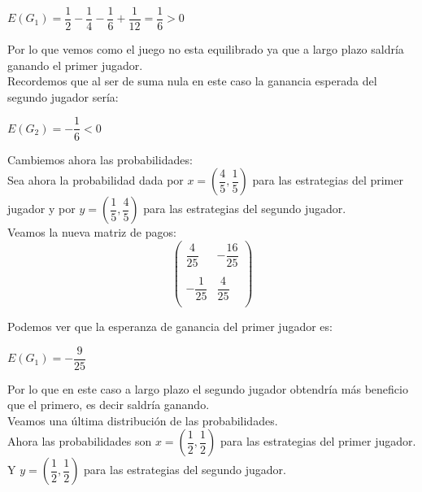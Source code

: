 \documentclass[10pt,a4paper]{book}
\begin{document}
\begin{center}

$ E(G_1)=\dfrac{1}{2}-\dfrac{1}{4}-\dfrac{1}{6}+\dfrac{1}{12}= \dfrac{1}{6} >0$

\end{center}

Por lo que vemos como el juego no esta equilibrado ya que a largo plazo saldría ganando el primer jugador. \\
Recordemos que al ser de suma nula en este caso la ganancia esperada del segundo jugador sería:\\

\begin{center}

$ E(G_2)=-\dfrac{1}{6} <0$

\end{center}

Cambiemos ahora las probabilidades:\\

Sea ahora la probabilidad dada por $x=(\dfrac{4}{5},\dfrac{1}{5})$ para las estrategias del primer jugador y por $y=(\dfrac{1}{5},\dfrac{4}{5})$ para las estrategias del segundo jugador.\\

Veamos la nueva matriz de pagos:\\


$$
\left(
\begin{array}{cccc}
\dfrac{4}{25} &  -\dfrac{16}{25} \\
\\
-\dfrac{1}{25} & \dfrac{4}{25} \\

\end{array}
\right)
$$

Podemos ver que la esperanza de ganancia del primer jugador es:\\

\begin{center}

$E(G_1)=-\dfrac{9}{25}$

\end{center}

Por lo que en este caso a largo plazo el segundo jugador obtendría más beneficio que el primero, es decir saldría ganando.\\

Veamos una última distribución de las probabilidades.\\

Ahora las probabilidades son $x=(\dfrac{1}{2},\dfrac{1}{2})$ para las estrategias del primer jugador. Y $y=(\dfrac{1}{2},\dfrac{1}{2})$ para las estrategias del segundo jugador.\\
\end{document}
